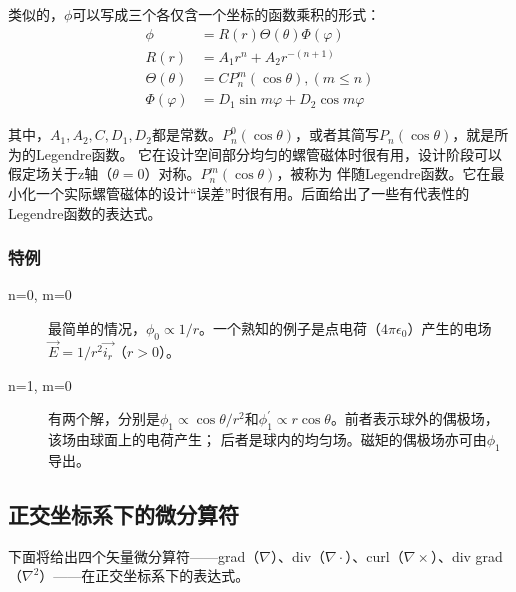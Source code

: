 类似的，$\phi$可以写成三个各仅含一个坐标的函数乘积的形式：
\begin{subequations}\label{eqn:laplace sph2}
	\begin{align}
  \phi&=R(r)\Theta(\theta)\Phi(\varphi)\\
  R(r)&=A_1 r^n+A_2 r^{-(n+1)} \\
  \Theta(\theta)&=C P_n^m(\cos \theta), (m \le n) \\
  \Phi(\varphi)&=D_1 \sin m\varphi +D_2 \cos m\varphi
  	\end{align}
\end{subequations}

其中，$A_1, A_2, C, D_1, D_2$都是常数。$P_n^0(\cos \theta)$，或者其简写$P_n(\cos\theta)$，就是所为的Legendre函数。
它在设计空间部分均匀的螺管磁体时很有用，设计阶段可以假定场关于z轴（$\theta=0$）对称。$P_n^m(\cos\theta)$，被称为
伴随Legendre函数。它在最小化一个实际螺管磁体的设计“误差”时很有用。后面给出了一些有代表性的Legendre函数的表达式。

\subsubsection{特例}
\begin{description}
  \item[n=0, m=0] 最简单的情况，$\phi_0\propto 1/r$。一个熟知的例子是点电荷（$4\pi\epsilon_0$）产生的电场$\vec{E}=1/r^2 \vec{i_r}$（$r>0$）。
  \item[n=1, m=0] 有两个解，分别是$\phi_1 \propto \cos\theta /r^2$和$\phi_1^\prime\propto r\cos\theta$。前者表示球外的偶极场，该场由球面上的电荷产生；
  后者是球内的均匀场。磁矩的偶极场亦可由$\phi_1$导出。
\end{description}

\subsection{正交坐标系下的微分算符}
下面将给出四个矢量微分算符——grad（$\nabla$）、div（$\nabla\cdot$）、curl（$\nabla\times$）、div grad（$\nabla^2$）——在正交坐标系下的表达式。
